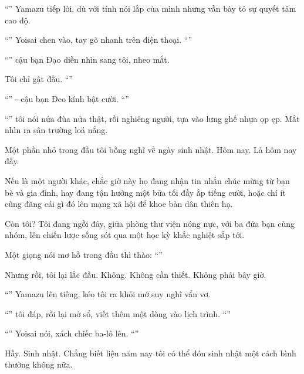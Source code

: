 \documentclass[../main.tex]{subfiles}
\begin{document}
``'' Yamazu tiếp lời, dù với tính nói lắp của mình nhưng vẫn bày tỏ sự quyết tâm cao độ.

``'' Yoisai chen vào, tay gõ nhanh trên điện thoại. ``''

``'' cậu bạn Đạo diễn nhìn sang tôi, nheo mắt.

Tôi chỉ gật đầu. ``''

``'' - cậu bạn Đeo kính bật cười. ``''

``'' tôi nói nửa đùa nửa thật, rồi nghiêng người, tựa vào lưng ghế nhựa ọp ẹp. Mắt nhìn ra sân trường loá nắng.

Một phần nhỏ trong đầu tôi bỗng nghĩ về ngày sinh nhật. Hôm nay. Là hôm nay đấy.

Nếu là một người khác, chắc giờ này họ đang nhận tin nhắn chúc mừng từ bạn bè và gia đình, hay đang tận hưởng một bữa tối đầy ắp tiếng cười, hoặc chí ít cũng đăng cái gì đó lên mạng xã hội để khoe bàn dân thiên hạ.

Còn tôi? Tôi đang ngồi đây, giữa phòng thư viện nóng nực, với ba đứa bạn cùng nhóm, lên chiến lược sống sót qua một học kỳ khắc nghiệt sắp tới.

Một giọng nói mơ hồ trong đầu thì thào: ``''

Nhưng rồi, tôi lại lắc đầu. Không. Không cần thiết. Không phải bây giờ.

``'' Yamazu lên tiếng, kéo tôi ra khỏi mớ suy nghĩ vẩn vơ.

``'' tôi đáp, rồi lại mở sổ, viết thêm một dòng vào lịch trình. ``''

``'' Yoisai nói, xách chiếc ba-lô lên. ``''

Hầy. Sinh nhật. Chẳng biết liệu năm nay tôi có thể đón sinh nhật một cách bình thường không nữa.
\end{document}
